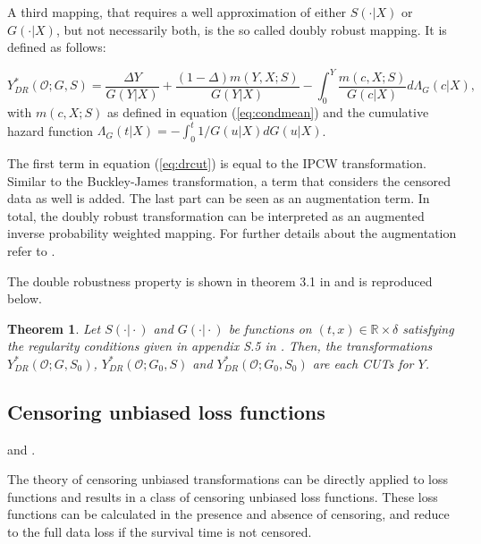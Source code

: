 \documentclass[12pt, a4paper]{article}
\theoremstyle{definition}
\theoremstyle{plain}
\newtheorem{Theorem}{Theorem}[section]
\numberwithin{equation}{section}
\numberwithin{figure}{section}
\numberwithin{table}{section}
\begin{document}
	A third mapping, that requires a well approximation of either  $S(\cdot\vert X)$ or $G(\cdot\vert X)$, but not necessarily both, is the so called doubly robust mapping.
	It is defined as follows:
	
	\begin{equation}\label{eq:drcut}
	Y_{DR}^* (\mathcal{O}; G, S) = \frac{\Delta Y}{G(Y\vert X)} + \frac{(1-\Delta)m(Y,X;S)}{G(Y \vert X)} - \int_{0}^{Y} \frac{m(c,X;S)}{G(c \vert X)} d\Lambda_G(c \vert X),
	\end{equation}
	with $m(c,X;S)$ as defined in equation (\ref{eq:condmean}) and the cumulative hazard function $\Lambda_G(t\vert X)=-\int_{0}^{t}1/G(u\vert X)dG(u\vert X)$.
	
	The first term in equation (\ref{eq:drcut}) is equal to the IPCW transformation.
	Similar to the Buckley-James transformation, a term that considers the censored data as well is added.
	The last part can be seen as an augmentation term.
	In total, the doubly robust transformation can be interpreted as an augmented inverse probability weighted mapping.
	For further details about the augmentation refer to \citet*{bookfailuretime}.
		
	The double robustness property is shown in theorem 3.1 in \citet*{culs} and is reproduced below.
	
	\begin{Theorem}\label{thm:dr}
		Let $S(\cdot \vert \cdot)$ and $G(\cdot\vert \cdot)$ be functions on $(t,x)\in \mathbb{R} \times \delta$ satisfying the regularity conditions given in appendix S.5 in \citet*{culs}. Then, the transformations $Y_{DR}^* (\mathcal{O}; G, S_0)$, $Y_{DR}^* (\mathcal{O}; G_0, S)$ and $Y_{DR}^* (\mathcal{O}; G_0, S_0)$ are each CUTs for $Y$.
	\end{Theorem}
	


	\subsection{Censoring unbiased loss functions}\label{sec:cudls}
	\citet*{culs} and \citet*{basearticle}.
	
	The theory of censoring unbiased transformations can be directly applied to loss functions and results in a class of censoring unbiased loss functions. 
	These loss functions can be calculated in the presence and absence of censoring, and reduce to the full data loss if the survival time is not censored.
	
\end{document}
